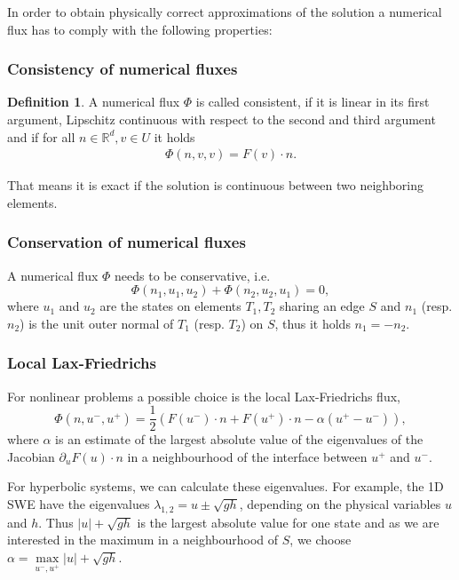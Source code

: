 \documentclass[a4paper,12pt]{article}
\theoremstyle{definition}
\newtheorem{Def}{Definition}
\theoremstyle{definition}
\begin{document}
In order to obtain physically correct approximations of the solution a numerical flux has to comply with the following properties:

\subsubsection*{Consistency of numerical fluxes}
\begin{Def}\label{def:flux:consistency}
	A numerical flux $\Phi$ is called consistent, if it is linear in its first argument, Lipschitz continuous with respect to the second and third argument and if for all $n\in \mathbb{R}^d, v\in U$ it holds
	\begin{align}
	\Phi(n,v,v) = F(v)\cdot n.
	\end{align}
\end{Def}

That means it is exact if the solution is continuous between two neighboring elements.

\subsubsection*{Conservation of numerical fluxes}
A numerical flux $\Phi$ needs to be conservative, i.e. 
\begin{equation}
\Phi(n_1,u_1,u_2) + \Phi(n_2, u_2, u_1) = 0,
\end{equation}
where $u_1$ and $u_2$ are the states on elements $T_1, T_2$ sharing an edge $S$ and $n_1$ (resp. $n_2$) is the unit outer normal of $T_1$ (resp. $T_2$) on $S$, thus it holds $n_1 = -n_2$. 

\subsubsection{Local Lax-Friedrichs}

For nonlinear problems a possible choice is the local Lax-Friedrichs flux, 
\begin{equation}
\Phi (n, u^-, u^+) = \frac{1}{2}\left(F(u^-)\cdot n + F(u^+)\cdot n - \alpha (u^+ -u^- )\right),
\end{equation}
where $\alpha$ is an estimate of the largest absolute value of the eigenvalues of the Jacobian $\partial_u F(u)\cdot n$ in a neighbourhood of the interface between $u^+$ and $u^-$. 


For hyperbolic systems, we can calculate these eigenvalues.
For example, the 1D SWE have the eigenvalues $\lambda_{1,2} = u \pm \sqrt{gh}$, depending on the physical variables $u$ and $h$. Thus $\vert u \vert +\sqrt{gh}$ is the largest absolute value for one state and as we are interested in the maximum in a neighbourhood of $S$, we choose $\alpha = \max\limits_{u^-, u^+} \vert u \vert +\sqrt{gh}$.
\end{document}

